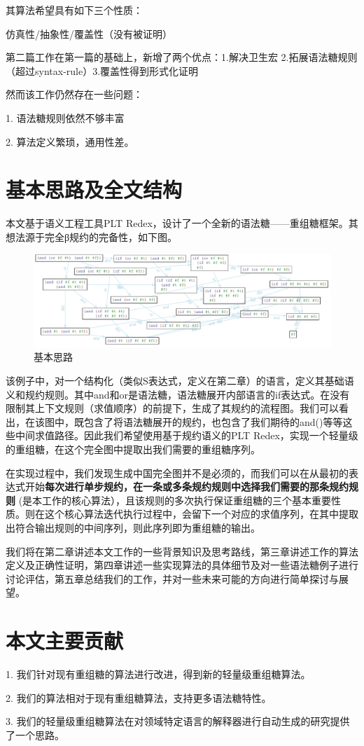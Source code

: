 其算法希望具有如下三个性质：

仿真性/抽象性/覆盖性（没有被证明）

第二篇工作在第一篇的基础上，新增了两个优点：1.解决卫生宏 2.拓展语法糖规则（超过syntax-rule）3.覆盖性得到形式化证明

然而该工作仍然存在一些问题：

1.	语法糖规则依然不够丰富

2.	算法定义繁琐，通用性差。
\section{基本思路及全文结构}

本文基于语义工程工具PLT Redex，设计了一个全新的语法糖——重组糖框架。其想法源于完全β规约的完备性，如下图。

\begin{figure}[h]
	\centering
	\includegraphics[width=12cm]{images/chapter1/example.png}
	\caption{基本思路}
\end{figure}

该例子中，对一个结构化（类似S表达式，定义在第二章）的语言，定义其基础语义和规约规则。其中and和or是语法糖，语法糖展开内部语言的if表达式。在没有限制其上下文规则（求值顺序）的前提下，生成了其规约的流程图。我们可以看出，在该图中，既包含了将语法糖展开的规约，也包含了我们期待的and()等等这些中间求值路径。因此我们希望使用基于规约语义的PLT Redex，实现一个轻量级的重组糖，在这个完全图中提取出我们需要的重组糖序列。

在实现过程中，我们发现生成中国完全图并不是必须的，而我们可以在从最初的表达式开始{\bfseries 每次进行单步规约，在一条或多条规约规则中选择我们需要的那条规约规则 }(是本工作的核心算法），且该规则的多次执行保证重组糖的三个基本重要性质。则在这个核心算法迭代执行过程中，会留下一个对应的求值序列，在其中提取出符合输出规则的中间序列，则此序列即为重组糖的输出。

我们将在第二章讲述本文工作的一些背景知识及思考路线，第三章讲述工作的算法定义及正确性证明，第四章讲述一些实现算法的具体细节及对一些语法糖例子进行讨论评估，第五章总结我们的工作，并对一些未来可能的方向进行简单探讨与展望。

\section{本文主要贡献}
1.	我们针对现有重组糖的算法进行改进，得到新的轻量级重组糖算法。

2.	我们的算法相对于现有重组糖算法，支持更多语法糖特性。

3.	我们的轻量级重组糖算法在对领域特定语言的解释器进行自动生成的研究提供了一个思路。


